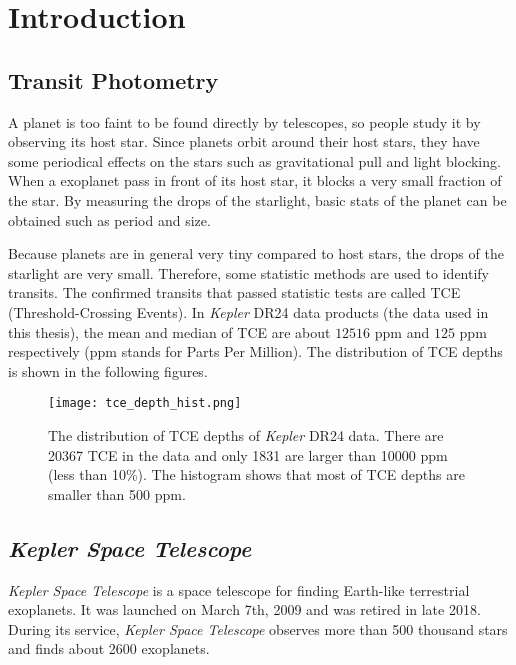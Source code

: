 
\chapter{Introduction}
  \section{Transit Photometry}
    A planet is too faint to be found directly by telescopes, so people study it 
    by observing its 
    host star. Since planets orbit around their host stars, they have some periodical effects 
    on the stars such as gravitational pull and light blocking. When a exoplanet pass in front 
    of its host star, it blocks a very small fraction of the star. By measuring the drops of  
    the starlight, basic stats of the planet can be obtained such as period and size. 

    Because planets are in general very tiny compared to host stars, the drops of the 
    starlight are very small. Therefore, some statistic methods are used to identify 
    transits. The confirmed transits that passed statistic tests are called TCE 
    (Threshold-Crossing Events).
    In \textit{Kepler} DR24 data products (the data used in this thesis), 
    the mean and median of TCE are 
    about $12516$ ppm and $125$ ppm respectively (ppm stands for Parts Per Million). The 
    distribution of TCE depths is shown in the following figures.

    \begin{figure}[!htp]
      \centering
      \texttt{[image: tce\_depth\_hist.png]}
      \caption[The distribution of TCE depths of \textit{Kepler} DR24 data.]
      {The distribution of TCE depths of \textit{Kepler} DR24 data. There are 20367 TCE
      in the data and only 1831 are larger than 10000 ppm (less than 10\%). 
      The histogram shows that most of TCE depths are smaller than 500 ppm.}
    \label{fig: tce_hist_and_pie} 
    \end{figure}

  
  \section{\textit{Kepler Space Telescope}}
    \textit{Kepler Space Telescope} is a space telescope for finding
    Earth-like terrestrial exoplanets. It was launched on March 7th, 2009 and 
    was retired in late 2018. During its service, \textit{Kepler Space Telescope} observes
    more than 500 thousand stars and finds about 2600 exoplanets.
    
